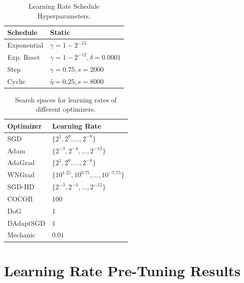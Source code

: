 \documentclass[letterpaper]{article} %
\begin{document}
\begin{table}[H]
	\centering
	\begin{tabular}{ll}
		\toprule
		Schedule    & Static                            \\ \midrule
		Exponential & $\gamma=1-2^{-13}$                \\
		Exp. Reset  & $\gamma=1-2^{-12}, \delta=0.0001$ \\
		Step        & $\gamma=0.75, s=2000$             \\
		Cyclic      & $\hat{\eta}=0.25, s=8000$         \\ \bottomrule
	\end{tabular}
	\caption{Learning Rate Schedule Hyperparameters.}
\end{table}

\begin{table}[H]
	\centering
	\begin{tabular}{ll}
		\toprule
		Optimizer & Learning Rate                                  \\
		\midrule
		SGD       & $\{2^{1}, 2^{0}, \ldots, 2^{-8}\}$             \\
		Adam      & $\{2^{-3}, 2^{-4}, \ldots, 2^{-12}\}$          \\
		AdaGrad   & $\{2^{1}, 2^{0}, \ldots, 2^{-8}\}$             \\
		WNGrad    & $\{10^{1.25}, 10^{0.75}, \ldots, 10^{-7.75}\}$ \\
		SGD-HD    & $\{2^{-3}, 2^{-4}, \ldots, 2^{-12}\}$          \\ \midrule
		COCOB     & $100$                                          \\
		DoG       & $1$                                            \\
		DAdaptSGD & $1$                                            \\
		Mechanic  & $0.01$                                         \\
		\bottomrule
	\end{tabular}
	\caption{Search spaces for learning rates of different optimizers.}
\end{table}

\section{Learning Rate Pre-Tuning Results}\label{app:pretune_model_sizes}
\end{document}
